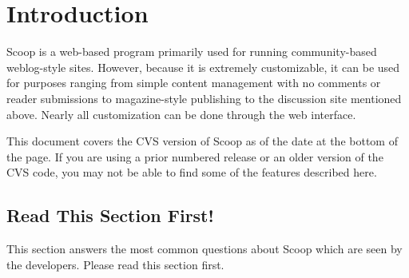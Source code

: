 \section{Introduction}

Scoop is a web-based program primarily used for running community-based weblog-style sites.  However, because it is extremely customizable, it can be used for purposes ranging from simple content management with no comments or reader submissions to magazine-style publishing to the discussion site mentioned above.  Nearly all customization can be done through the web interface.


This document covers the CVS version of Scoop as of the date at the bottom of the page.  If you are using a prior numbered release or an older version of the CVS code, you may not be able to find some of the features described here.

\subsection{Read This Section First!}

This section answers the most common questions about Scoop which are seen by the developers. Please read this section first.

